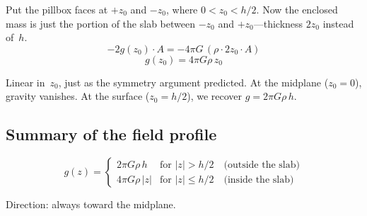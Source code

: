 \documentclass[11pt, letterpaper]{article}
\begin{document}
Put the pillbox faces at $+z_0$ and $-z_0$, where $0 < z_0 < h/2$. Now the enclosed mass is just the portion of the slab between $-z_0$ and $+z_0$---thickness $2z_0$ instead of~$h$.
\begin{equation}
  -2g(z_0)\cdot A = -4\pi G\,(\rho \cdot 2z_0 \cdot A)
\end{equation}
\begin{equation}
  g(z_0) = 4\pi G \rho\, z_0
\end{equation}

Linear in~$z_0$, just as the symmetry argument predicted. At the midplane ($z_0 = 0$), gravity vanishes. At the surface ($z_0 = h/2$), we recover $g = 2\pi G \rho\,h$.

\subsection{Summary of the field profile}

\begin{equation}
  \boxed{\;g(z) = \begin{cases} 2\pi G \rho\, h & \text{for } |z| > h/2 \quad \text{(outside the slab)} \\[8pt] 4\pi G \rho\, |z| & \text{for } |z| \leq h/2 \quad \text{(inside the slab)} \end{cases}\;}
  \label{eq:profile}
\end{equation}

\noindent Direction: always toward the midplane.

\end{document}
